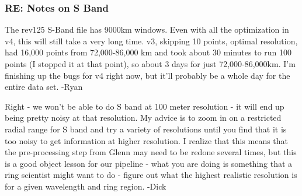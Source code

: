 \documentclass[crop=false,class=article,oneside]{standalone}
\begin{document}
\subsubsection{\footnotesize RE: Notes on S Band}
The rev125 S-Band file has 9000km windows. Even with all the optimization in v4, this will still take a very long time. v3, skipping 10 points, optimal resolution, had 16,000 points from 72,000-86,000 km and took about 30 minutes to run 100 points (I stopped it at that point), so about 3 days for just 72,000-86,000km. I'm finishing up the bugs for v4 right now, but it'll probably be a whole day for the entire data set. -Ryan\par
Right - we won't be able to do S band at 100 meter resolution - it will end up being pretty noisy at that resolution. My advice is to zoom in on a restricted radial range for S band and try a variety of resolutions until you find that it is too noisy to get information at higher resolution. I realize that this means that the pre-processing step from Glenn may need to be redone several times, but this is a good object lesson for our pipeline - what you are doing is something that a ring scientist might want to do - figure out what the highest realistic resolution is for a given wavelength and ring region. -Dick
\end{document}
